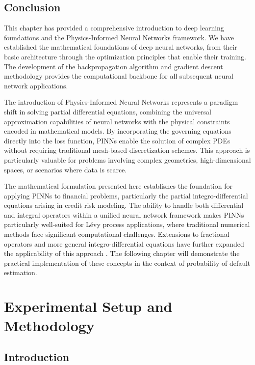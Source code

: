 \documentclass[11pt,twoside,openright]{report}
\begin{document}
\section{Conclusion}
\label{sec:conclusion_chapter3}

This chapter has provided a comprehensive introduction to deep learning foundations and the Physics-Informed Neural Networks framework. We have established the mathematical foundations of deep neural networks, from their basic architecture through the optimization principles that enable their training. The development of the backpropagation algorithm and gradient descent methodology provides the computational backbone for all subsequent neural network applications.

The introduction of Physics-Informed Neural Networks represents a paradigm shift in solving partial differential equations, combining the universal approximation capabilities of neural networks with the physical constraints encoded in mathematical models. By incorporating the governing equations directly into the loss function, PINNs enable the solution of complex PDEs without requiring traditional mesh-based discretization schemes. This approach is particularly valuable for problems involving complex geometries, high-dimensional spaces, or scenarios where data is scarce.

The mathematical formulation presented here establishes the foundation for applying PINNs to financial problems, particularly the partial integro-differential equations arising in credit risk modeling. The ability to handle both differential and integral operators within a unified neural network framework makes PINNs particularly well-suited for Lévy process applications, where traditional numerical methods face significant computational challenges. Extensions to fractional operators and more general integro-differential equations have further expanded the applicability of this approach \cite{pang2019fpinns}. The following chapter will demonstrate the practical implementation of these concepts in the context of probability of default estimation.

\chapter{Experimental Setup and Methodology}
\label{ch:experimental_setup}

\section{Introduction}
\label{sec:exp_intro}
\end{document}
